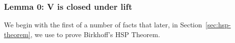 \subsubsection{Lemma 0: V is closed under lift}\label{lemma-0-v-is-closed-under-lift}
We begin with the first of a number of facts that later, in Section~\ref{sec:hsp-theorem}, we use to prove Birkhoff's HSP Theorem.
\ccpad
\begin{code}%
\>[0]\AgdaSpace{}%
\AgdaSpace{}%
\AgdaSymbol{\{}\AgdaSymbol{\}\{}\AgdaSymbol{\}\{}\AgdaSymbol{\}}\<%
\\
%
\\[\AgdaEmptyExtraSkip]%
\>[0]\AgdaSpace{}%
\<%
\\
\>[0][@{}l@{\AgdaIndent{0}}]%
\>[1]\AgdaSymbol{\{}\AgdaSpace{}%
\AgdaSymbol{:}\AgdaSpace{}%
\AgdaSpace{}%
\AgdaSymbol{(}\AgdaSpace{}%
\AgdaSpace{}%
\AgdaSymbol{)}\AgdaSpace{}%
\AgdaSymbol{(}\AgdaSpace{}%
\AgdaSymbol{)\}}\<%
\\
%
\>[1]\<%
\\
\>[1][@{}l@{\AgdaIndent{0}}]%
\>[11]\AgdaSymbol{\{}\AgdaSpace{}%
\AgdaSymbol{:}\AgdaSpace{}%
\AgdaSpace{}%
\AgdaSymbol{(}\AgdaSpace{}%
\AgdaSymbol{)(}\AgdaSpace{}%
\AgdaSymbol{)\}}\<%
\\
%
\>[11]\AgdaSymbol{\{}\AgdaSpace{}%
\AgdaSymbol{:}\AgdaSpace{}%
\AgdaSpace{}%
\AgdaSymbol{(}\AgdaSpace{}%
\AgdaSymbol{)\}}\<%
\\
%
\>[11]\AgdaSymbol{\{}\AgdaSpace{}%
\AgdaSymbol{:}\AgdaSpace{}%
\AgdaSpace{}%
\AgdaSpace{}%
\AgdaSpace{}%
\AgdaSpace{}%
\AgdaSpace{}%
\AgdaSymbol{((}\AgdaSpace{}%
\AgdaSymbol{)}\AgdaSpace{}%
\AgdaSpace{}%
\AgdaSymbol{)\}}\<%
\\
%
\>[11]\AgdaSymbol{\{}\AgdaSpace{}%
\AgdaSymbol{:}\AgdaSpace{}%
\AgdaSpace{}%
\AgdaSpace{}%
\AgdaSpace{}%
\AgdaSpace{}%
\AgdaSymbol{(}\AgdaSymbol{\{}\AgdaSpace{}%
\AgdaSymbol{\}\{}\AgdaSpace{}%

\end{code}
